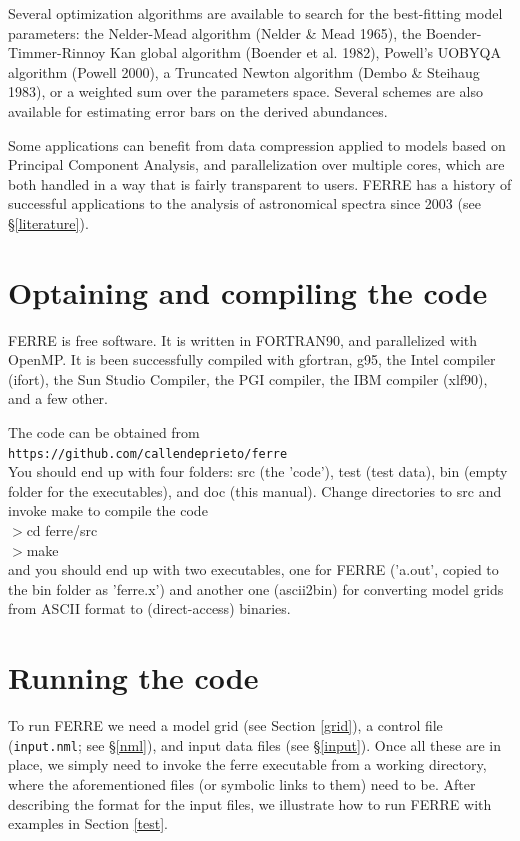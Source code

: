 \documentclass[12pt]{article}
\begin{document}
Several optimization algorithms are available to search for the 
best-fitting model parameters: 
the Nelder-Mead algorithm (Nelder \& Mead 1965), 
the  Boender-Timmer-Rinnoy Kan global algorithm (Boender et al. 1982), 
Powell's UOBYQA algorithm (Powell 2000), 
a Truncated Newton algorithm (Dembo \& Steihaug 1983), 
or a weighted sum over the parameters space. Several schemes are also available 
for estimating error bars on the derived abundances. 

Some applications can benefit from data compression applied to models based on 
Principal Component Analysis, and parallelization
over multiple cores, which are both handled in a way that is
fairly transparent to users.
FERRE has a history of successful applications to the analysis of
astronomical spectra since 2003 (see \S \ref{literature}).

\section{Optaining and compiling the code}
\label{compiling}

FERRE is free software. It is written in FORTRAN90, and parallelized
with OpenMP. It is been successfully compiled with gfortran, g95, 
the Intel compiler (ifort), the  Sun Studio Compiler, the PGI compiler, 
the IBM compiler (xlf90), and a few other.

The code can be obtained from \\
{\tt https://github.com/callendeprieto/ferre} \\
You should end up with four
folders: src (the 'code'), test (test data), bin (empty folder for the executables), 
and doc (this manual). Change directories to src and invoke
make to compile the code  \\
$>$cd  ferre/src \\
$>$make  \\
\noindent and you should end up with two executables, 
one for FERRE ('a.out', copied to the bin folder as 'ferre.x') and 
another one (ascii2bin) for  converting model grids from ASCII 
format to (direct-access) binaries.

\section{Running the code}
\label{running}

To run FERRE we need a model grid (see Section \ref{grid}), a control
file ({\tt input.nml}; see \S \ref{nml}), 
and input data files (see \S \ref{input}).
Once all these are in place, we simply need to invoke the ferre executable
from a working directory, where the aforementioned files 
(or symbolic links to them) need to be. After describing the format 
for the input files, we illustrate how to run FERRE with examples
in Section \ref{test}.
\end{document}
